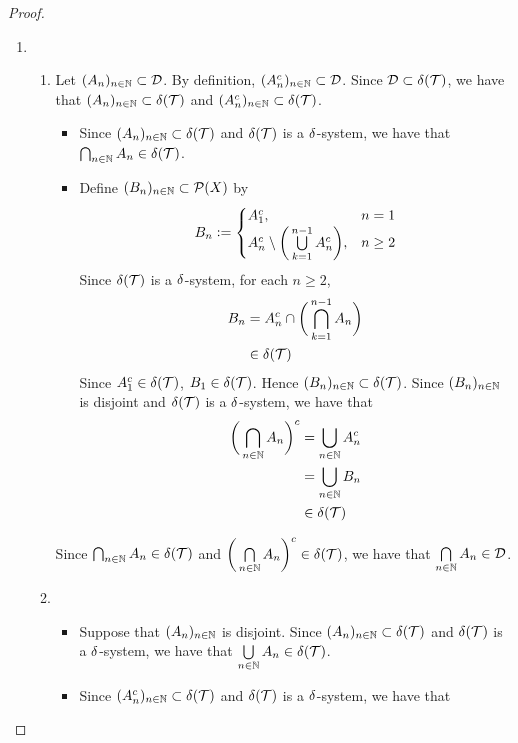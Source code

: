 \documentclass{book}
\begin{document}
	\begin{proof}\
		\begin{enumerate}
			\item \
			\begin{enumerate}
				\item Let $(A_n)_{n \in \mathbb{N}} \subset \mathcal{D}$. By definition, $(A_n^c)_{n \in \mathbb{N}} \subset \mathcal{D}$. Since $\mathcal{D} \subset \delta(\mathcal{T})$, we have that $(A_n)_{n \in \mathbb{N}} \subset \delta(\mathcal{T})$ and $(A_n^c)_{n \in \mathbb{N}} \subset \delta(\mathcal{T})$.
				\begin{itemize}
					\item Since $(A_n)_{n \in \mathbb{N}} \subset \delta(\mathcal{T})$ and $\delta(\mathcal{T})$ is a $\delta$-system, we have that $\bigcap_{n \in \mathbb{N}} A_n \in \delta(\mathcal{T})$. 
					\item Define $(B_n)_{n \in \mathbb{N}} \subset \mathcal{P}(X)$ by 
					\[
					B_n \vcentcolon= 
					\begin{cases}
						A_1^c, & n = 1 \\
						A_n^c \setminus \bigg( \bigcup\limits_{k=1}^{n-1} A_n^c \bigg), & n \geq 2
					\end{cases}
					\]
					Since $\delta(\mathcal{T})$ is a $\delta$-system, for each $n \geq 2$, 
					\begin{align*}
						B_n
						& = A_n^c \cap \bigg( \bigcap_{k=1}^{n-1} A_n \bigg) \\
						& \in \delta(\mathcal{T})
					\end{align*}
					Since $A_1^c \in \delta(\mathcal{T})$, $B_1 \in \delta(\mathcal{T})$. Hence $(B_n)_{n \in \mathbb{N}} \subset \delta(\mathcal{T})$. Since $(B_n)_{n \in \mathbb{N}}$ is disjoint and $\delta(\mathcal{T})$ is a $\delta$-system, we have that 
					\begin{align*}
						\bigg( \bigcap_{n \in \mathbb{N}} A_n \bigg)^c
						& = \bigcup_{n \in \mathbb{N}} A_n^c \\
						& = \bigcup_{n \in \mathbb{N}} B_n \\ 
						& \in \delta(\mathcal{T})
					\end{align*}
				\end{itemize}
				Since $\bigcap_{n \in \mathbb{N}} A_n \in \delta(\mathcal{T})$ and $\bigg( \bigcap\limits_{n \in \mathbb{N}} A_n \bigg)^c \in \delta(\mathcal{T})$, we have that $\bigcap\limits_{n \in \mathbb{N}} A_n \in \mathcal{D}$.
				\item 
				\begin{itemize}
					\item Suppose that $(A_n)_{n \in \mathbb{N}}$ is disjoint. Since $(A_n)_{n \in \mathbb{N}} \subset \delta(\mathcal{T})$ and $\delta(\mathcal{T})$ is a $\delta$-system, we have that $\bigcup\limits_{n \in \mathbb{N}} A_n \in \delta(\mathcal{T})$.
					\item Since $(A_n^c)_{n \in \mathbb{N}} \subset \delta(\mathcal{T})$ and $\delta(\mathcal{T})$ is a $\delta$-system, we have that 

\end{itemize}
\end{enumerate}
\end{enumerate}
\end{proof}
\end{document}
